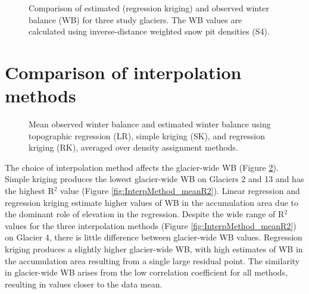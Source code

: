 \documentclass{sfuthesis}
\begin{document}
\begin{figure}[H]
	\caption{Comparison of estimated (regression kriging) and observed winter balance (WB) for three study glaciers. The WB values are calculated using inverse-distance weighted snow pit densities (S4).}
	\label{fig:R2regressionkrig}
\end{figure}


\section{Comparison of interpolation methods}
\label{sec:compareInterpMethods}

\begin{figure}[b]
	\caption{Mean observed winter balance and estimated winter balance using topographic regression (LR), simple kriging (SK), and regression kriging (RK), averaged over density assignment methods.}
	\label{fig:InterpMethod_mean}
\end{figure}


The choice of interpolation method affects the glacier-wide WB (Figure \ref{fig:InterpMethod_mean}). Simple kriging produces the lowest glacier-wide WB on Glaciers 2 and 13 and has the highest R$^2$ value (Figure \ref{fig:InterpMethod_meanR2}). Linear regression and regression kriging estimate higher values of WB in the accumulation area due to the dominant role of elevation in the regression. Despite the wide range of R$^2$ values for the three interpolation methods (Figure \ref{fig:InterpMethod_meanR2}) on Glacier 4, there is little difference between glacier-wide WB values. Regression kriging produces a slightly higher glacier-wide WB, with high estimates of WB in the accumulation area resulting from a single large residual point. The similarity in glacier-wide WB arises from the low correlation coefficient for all methods, resulting in values closer to the data mean. 
\end{document}
